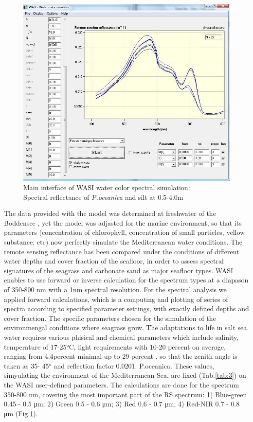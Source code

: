 \documentclass[10pt, a4paper]{article}
\begin{document}
\begin{figure}[h]
	\centering
	\includegraphics[scale=0.30]{Fig-30.jpg}
	\caption{Main interface of WASI water color spectral simulation: \\ Spectral reflectance of \textit{P.oceanica} and silt at 0.5-4.0m}
	\label{fig:30}
\end{figure}

The data provided with the model was determined at freshwater of the Boddensee \cite{Gege05}\label{Gege05}, 
yet the model was adjasted for the marine
environment, so that its parameters (concentration of chlorophyll, concentration of small particles,
yellow substance, etc) now perfectly simulate the Mediterranean water conditions.
The remote sensing reflectance has been compared under the conditions of different water depths and
cover fraction of the seafloor, in order to assess spectral signatures of the seagrass and carbonate sand
as major seafloor types. WASI enables to use forward or inverse calculation for the spectrum types at
a diapason of 350-800 nm with a 1nm spectral resolution. For the spectral analysis we applied
forward calculations, which is a computing and plotting of series of spectra according to specified
parameter settings, with exactly defined depths and cover fraction.
The specific parameters chosen for the simulation of the environmengal conditions where seagrass
grow. The adaptations to life in salt sea water requires various phisical and chemical parameters
which include salinity, temperature of 17-25°C, light requirements with 10-20 percent on average, ranging
from 4.4percent  minimal up to 29 percent \cite{McKenzie09}\label{McKenzie09}, so that the zenith angle is taken as 35-
45° and reflection factor 0.0201. P.oceanica. These values, simyulating the environment of the Mediterranean Sea, are fixed (Tab.\ref{tab:3}) on the WASI user-defined parameters.
The calculations are done for the spectrum 350-800 nm, covering the most important part of the RS spectrum: 1) Blue-green 0.45 - 0.5 μm; 2) Green 0.5 - 0.6 μm; 3) Red 0.6 - 0.7 μm; 4) Red-NIR 0.7 - 0.8 μm (Fig.\ref{fig:30}).
\end{document}

